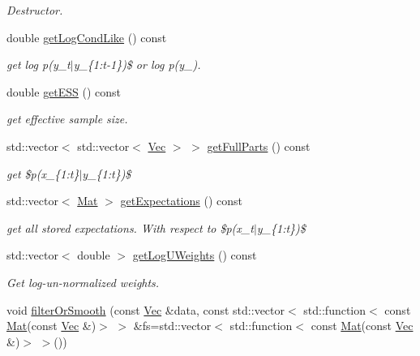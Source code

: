 \begin{DoxyCompactItemize}
\begin{DoxyCompactList}\small\item\em Destructor. \end{DoxyCompactList}\item 
double \hyperlink{classSISRFilter_a9bec319e692266cacdd7e6cd9b60e77d}{get\+Log\+Cond\+Like} () const 
\begin{DoxyCompactList}\small\item\em get log p(y\+\_\+t$\vert$y\+\_\+\{1\+:t-\/1\})\$ or log p(y\+\_). \end{DoxyCompactList}\item 
double \hyperlink{classSISRFilter_aab226ed51d07c493151a6788e6f90b86}{get\+E\+SS} () const 
\begin{DoxyCompactList}\small\item\em get effective sample size. \end{DoxyCompactList}\item 
std\+::vector$<$ std\+::vector$<$ \hyperlink{pmfs_8h_a4c7df05c6f5e8a0d15ae14bcdbc07152}{Vec} $>$ $>$ \hyperlink{classSISRFilter_a8ca159b052883c9c4dc0231145f6fe85}{get\+Full\+Parts} () const 
\begin{DoxyCompactList}\small\item\em get \$p(x\+\_\+\{1\+:t\}$\vert$y\+\_\+\{1\+:t\})\$ \end{DoxyCompactList}\item 
std\+::vector$<$ \hyperlink{pmfs_8h_ae601f56a556993079f730483c574356f}{Mat} $>$ \hyperlink{classSISRFilter_a4dd3b90b857114e599a8f71703cb768e}{get\+Expectations} () const 
\begin{DoxyCompactList}\small\item\em get all stored expectations. With respect to \$p(x\+\_\+t$\vert$y\+\_\+\{1\+:t\})\$ \end{DoxyCompactList}\item 
std\+::vector$<$ double $>$ \hyperlink{classSISRFilter_aa87ac349cbc21f70fb51c24fcbbc521a}{get\+Log\+U\+Weights} () const 
\begin{DoxyCompactList}\small\item\em Get log-\/un-\/normalized weights. \end{DoxyCompactList}\item 
void \hyperlink{classSISRFilter_a8c22a038dc47490b5532f2ec6c21a548}{filter\+Or\+Smooth} (const \hyperlink{pmfs_8h_a4c7df05c6f5e8a0d15ae14bcdbc07152}{Vec} \&data, const std\+::vector$<$ std\+::function$<$ const \hyperlink{pmfs_8h_ae601f56a556993079f730483c574356f}{Mat}(const \hyperlink{pmfs_8h_a4c7df05c6f5e8a0d15ae14bcdbc07152}{Vec} \&)$>$ $>$ \&fs=std\+::vector$<$ std\+::function$<$ const \hyperlink{pmfs_8h_ae601f56a556993079f730483c574356f}{Mat}(const \hyperlink{pmfs_8h_a4c7df05c6f5e8a0d15ae14bcdbc07152}{Vec} \&)$>$ $>$())

\end{DoxyCompactItemize}
